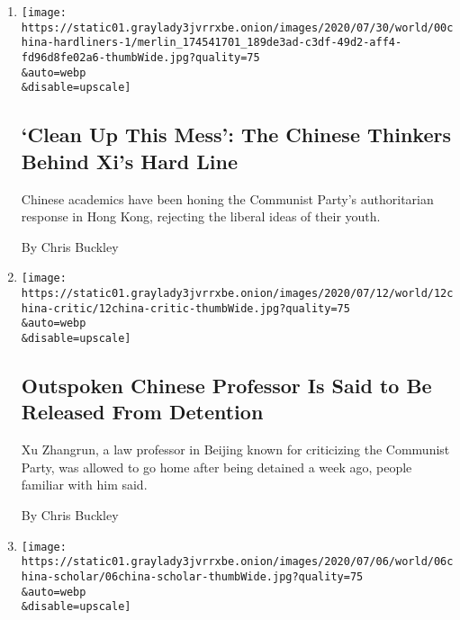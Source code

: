 \begin{enumerate}
\def\labelenumi{\arabic{enumi}.}
\item
  \href{/2020/08/02/world/asia/china-hong-kong-national-security-law.html}{}

  \texttt{[image: https://static01.graylady3jvrrxbe.onion/images/2020/07/30/world/00china-hardliners-1/merlin\_174541701\_189de3ad-c3df-49d2-aff4-fd96d8fe02a6-thumbWide.jpg?quality=75\\\&auto=webp\\\&disable=upscale]}

  \hypertarget{clean-up-this-mess-the-chinese-thinkers-behind-xis-hard-line}{%
  \subsection{`Clean Up This Mess': The Chinese Thinkers Behind Xi's
  Hard
  Line}\label{clean-up-this-mess-the-chinese-thinkers-behind-xis-hard-line}}

  Chinese academics have been honing the Communist Party's authoritarian
  response in Hong Kong, rejecting the liberal ideas of their youth.

  By Chris Buckley
\item
  \href{/2020/07/12/world/asia/xu-zhangrun-china-xi.html}{}

  \texttt{[image: https://static01.graylady3jvrrxbe.onion/images/2020/07/12/world/12china-critic/12china-critic-thumbWide.jpg?quality=75\\\&auto=webp\\\&disable=upscale]}

  \hypertarget{outspoken-chinese-professor-is-said-to-be-released-from-detention}{%
  \subsection{Outspoken Chinese Professor Is Said to Be Released From
  Detention}\label{outspoken-chinese-professor-is-said-to-be-released-from-detention}}

  Xu Zhangrun, a law professor in Beijing known for criticizing the
  Communist Party, was allowed to go home after being detained a week
  ago, people familiar with him said.

  By Chris Buckley
\item
  \href{/2020/07/06/world/asia/china-detains-xu-zhangrun-critic.html}{}

  \texttt{[image: https://static01.graylady3jvrrxbe.onion/images/2020/07/06/world/06china-scholar/06china-scholar-thumbWide.jpg?quality=75\\\&auto=webp\\\&disable=upscale]}

  \hypertarget{seized-by-the-police-an-outspoken-chinese-professor-sees-fears-come-true}{%
}
\end{enumerate}
